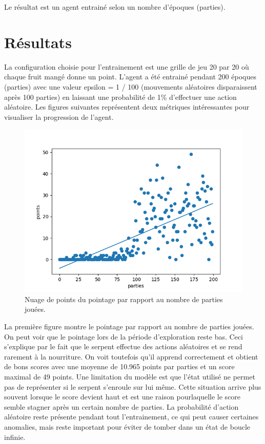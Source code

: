 \documentclass{article}
\begin{document}
Le résultat est un agent entrainé selon un nombre d'époques (parties).

\section{Résultats}

La configuration choisie pour l'entrainement est une grille de jeu 20 par 20 où chaque fruit mangé donne un point. L’agent a été entrainé pendant 200 époques (parties) avec une valeur epsilon = 1 / 100 (mouvements aléatoires disparaissent après 100 parties) en laissant une probabilité de 1\% d'effectuer une action aléatoire. Les figures suivantes représentent deux métriques intéressantes pour visualiser la progression de l'agent.

\begin{figure}[ht]
	\includegraphics[width=\linewidth]{scatter_score_200_games.png}
	\caption{Nuage de points du pointage par rapport au nombre de parties jouées.}
	\label{fig:Snake}
\end{figure}

La première figure montre le pointage par rapport au nombre de parties jouées. On peut voir que le pointage lors de la période d’exploration reste bas. Ceci  s'explique par le fait que le serpent effectue des actions aléatoires et se rend rarement à la nourriture. On voit toutefois qu’il apprend correctement et obtient de bons scores avec une moyenne de 10.965 points par parties et un score maximal de 49 points. Une limitation du modèle est que l’état utilisé ne permet pas de représenter si le serpent s’enroule sur lui même. Cette situation arrive plus souvent lorsque le score devient haut et est une raison pourlaquelle le score semble stagner après un certain nombre de parties. La probabilité d’action aléatoire reste présente pendant tout l'entrainement, ce qui peut causer certaines anomalies, mais reste important pour éviter de tomber dans un état de boucle infinie.
\end{document}
